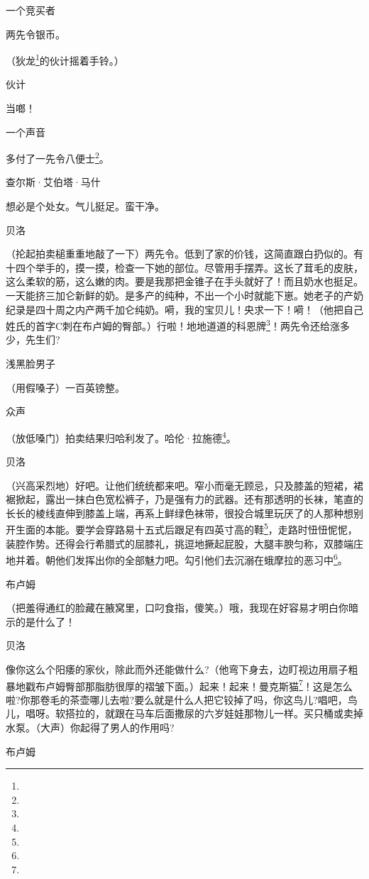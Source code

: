 \par 一个竞买者
\par 两先令银币。
\par （狄龙\footnote{}的伙计摇着手铃。）
\par 伙计
\par 当啷！
\par 一个声音
\par 多付了一先令八便士\footnote{}。
\par 查尔斯·艾伯塔·马什
\par 想必是个处女。气儿挺足。蛮干净。
\par 贝洛
\par （抡起拍卖槌重重地敲了一下）两先令。低到了家的价钱，这简直跟白扔似的。有十四个举手的，摸一摸，检查一下她的部位。尽管用手摆弄。这长了茸毛的皮肤，这么柔软的筋，这么嫩的肉。要是我那把金锥子在手头就好了！而且奶水也挺足。一天能挤三加仑新鲜的奶。是多产的纯种，不出一个小时就能下崽。她老子的产奶纪录是四十周之内产两千加仑纯奶。嗬，我的宝贝儿！央求一下！嗬！（他把自己姓氏的首字C刺在布卢姆的臀部。）行啦！地地道道的科恩牌\footnote{}！两先令还给涨多少，先生们?
\par 浅黑脸男子
\par （用假嗓子）一百英镑整。
\par 众声
\par （放低嗓门）拍卖结果归哈利发了。哈伦·拉施德\footnote{}。
\par 贝洛
\par （兴高采烈地）好吧。让他们统统都来吧。窄小而毫无顾忌，只及膝盖的短裙，裙裾掀起，露出一抹白色宽松裤子，乃是强有力的武器。还有那透明的长袜，笔直的长长的棱线直伸到膝盖上端，再系上鲜绿色袜带，很投合城里玩厌了的人那种想别开生面的本能。要学会穿路易十五式后跟足有四英寸高的鞋\footnote{}，走路时忸忸怩怩，装腔作势。还得会行希腊式的屈膝礼，挑逗地撅起屁股，大腿丰腴匀称，双膝端庄地并着。朝他们发挥出你的全部魅力吧。勾引他们去沉溺在蛾摩拉的恶习中\footnote{}。
\par 布卢姆
\par （把羞得通红的脸藏在腋窝里，口叼食指，傻笑。）哦，我现在好容易才明白你暗示的是什么了！
\par 贝洛
\par 像你这么个阳痿的家伙，除此而外还能做什么?（他弯下身去，边盯视边用扇子粗暴地戳布卢姆臀部那脂肪很厚的褶皱下面。）起来！起来！曼克斯猫\footnote{}！这是怎么啦?你那卷毛的茶壶哪儿去啦?要么就是什么人把它铰掉了吗，你这鸟儿?唱吧，鸟儿，唱呀。软搭拉的，就跟在马车后面撒尿的六岁娃娃那物儿一样。买只桶或卖掉水泵。（大声）你起得了男人的作用吗?
\par 布卢姆
